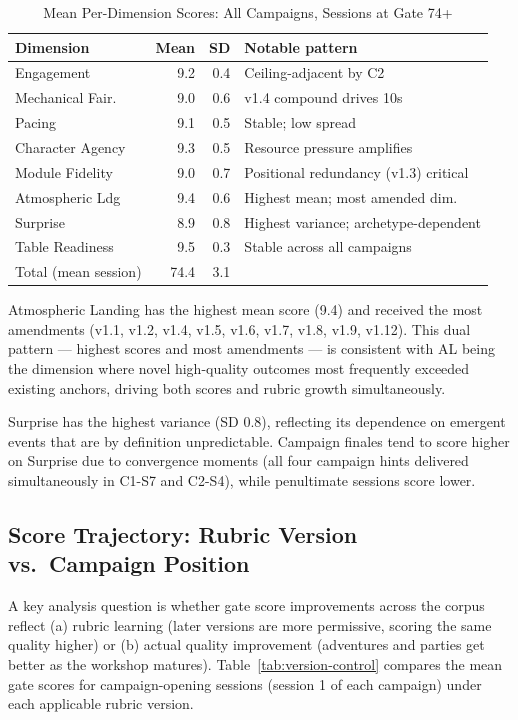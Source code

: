 \begin{table}[t]
\caption{Mean Per-Dimension Scores: All Campaigns, Sessions at Gate 74+}
\label{tab:dimension-scores}
\begin{tabular}{@{}lrrl@{}}
\toprule
Dimension & Mean & SD & Notable pattern \\
\midrule
Engagement      & 9.2 & 0.4 & Ceiling-adjacent by C2 \\
Mechanical Fair.& 9.0 & 0.6 & v1.4 compound drives 10s \\
Pacing          & 9.1 & 0.5 & Stable; low spread \\
Character Agency& 9.3 & 0.5 & Resource pressure amplifies \\
Module Fidelity & 9.0 & 0.7 & Positional redundancy (v1.3) critical \\
Atmospheric Ldg & 9.4 & 0.6 & Highest mean; most amended dim. \\
Surprise        & 8.9 & 0.8 & Highest variance; archetype-dependent \\
Table Readiness & 9.5 & 0.3 & Stable across all campaigns \\
\midrule
Total (mean session) & 74.4 & 3.1 & \\
\bottomrule
\end{tabular}
\end{table}

Atmospheric Landing has the highest mean score (9.4) and received the most amendments
(v1.1, v1.2, v1.4, v1.5, v1.6, v1.7, v1.8, v1.9, v1.12). This dual pattern --- highest
scores and most amendments --- is consistent with AL being the dimension where novel
high-quality outcomes most frequently exceeded existing anchors, driving both scores
and rubric growth simultaneously.

Surprise has the highest variance (SD 0.8), reflecting its dependence on emergent
events that are by definition unpredictable. Campaign finales tend to score higher on
Surprise due to convergence moments (all four campaign hints delivered simultaneously
in C1-S7 and C2-S4), while penultimate sessions score lower.

\subsection{Score Trajectory: Rubric Version vs.\ Campaign Position}

A key analysis question is whether gate score improvements across the corpus reflect
(a) rubric learning (later versions are more permissive, scoring the same quality higher)
or (b) actual quality improvement (adventures and parties get better as the workshop
matures). Table~\ref{tab:version-control} compares the mean gate scores for campaign-opening
sessions (session 1 of each campaign) under each applicable rubric version.

